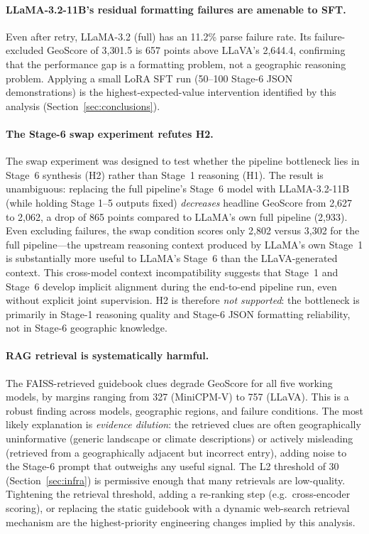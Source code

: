 \documentclass[11pt]{article}
\begin{document}
\paragraph{LLaMA-3.2-11B's residual formatting failures are amenable to SFT.}
Even after retry, LLaMA-3.2 (full) has an 11.2\% parse failure rate. Its
failure-excluded GeoScore of 3{,}301.5 is 657 points above LLaVA's 2{,}644.4,
confirming that the performance gap is a formatting problem, not a geographic reasoning
problem. Applying a small LoRA SFT run (50--100 Stage-6 JSON demonstrations)
is the highest-expected-value intervention identified by this analysis
(Section~\ref{sec:conclusions}).

\paragraph{The Stage-6 swap experiment refutes H2.}
The swap experiment was designed to test whether the pipeline bottleneck lies in
Stage~6 synthesis (H2) rather than Stage~1 reasoning (H1). The result is unambiguous:
replacing the full pipeline's Stage~6 model with LLaMA-3.2-11B (while holding Stage
1--5 outputs fixed) \emph{decreases} headline GeoScore from 2{,}627 to 2{,}062, a
drop of 865 points compared to LLaMA's own full pipeline (2{,}933). Even excluding
failures, the swap condition scores only 2{,}802 versus 3{,}302 for the full
pipeline---the upstream reasoning context produced by LLaMA's own Stage~1 is
substantially more useful to LLaMA's Stage~6 than the LLaVA-generated context.
This cross-model context incompatibility suggests that Stage~1 and Stage~6
develop implicit alignment during the end-to-end pipeline run, even without
explicit joint supervision. H2 is therefore \emph{not supported}: the bottleneck is
primarily in Stage-1 reasoning quality and Stage-6 JSON formatting reliability,
not in Stage-6 geographic knowledge.

\paragraph{RAG retrieval is systematically harmful.}
The FAISS-retrieved guidebook clues degrade GeoScore for all five working models,
by margins ranging from 327 (MiniCPM-V) to 757 (LLaVA). This is a robust finding
across models, geographic regions, and failure conditions. The most likely explanation
is \emph{evidence dilution}: the retrieved clues are often geographically uninformative
(generic landscape or climate descriptions) or actively misleading (retrieved from a
geographically adjacent but incorrect entry), adding noise to the Stage-6 prompt that
outweighs any useful signal. The L2 threshold of 30 (Section~\ref{sec:infra}) is
permissive enough that many retrievals are low-quality. Tightening the retrieval
threshold, adding a re-ranking step (e.g.\ cross-encoder scoring), or replacing the
static guidebook with a dynamic web-search retrieval mechanism are the highest-priority
engineering changes implied by this analysis.
\end{document}
